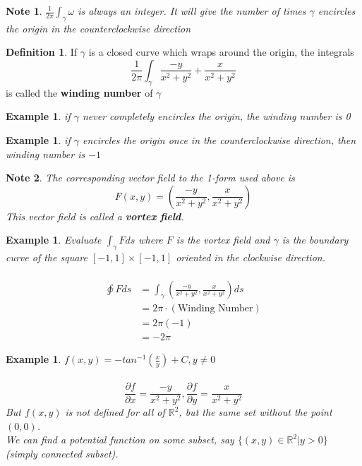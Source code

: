 \documentclass[12pt]{article}
\theoremstyle{plain}
\newtheorem*{note}{Note}
\newtheorem{example}[theorem]{Example}
\theoremstyle{definition}
\newtheorem{definition}[theorem]{Definition}
\begin{document}
	\begin{note}
		$\frac{1}{2\pi} \int_{\gamma} \omega$ is always an integer. It will give the number of times $\gamma$ encircles the origin in the counterclockwise direction
	\end{note}

	\begin{definition}
		If $\gamma$ is a closed curve which wraps around the origin, the integrals
		$$\frac{1}{2\pi} \int_{\gamma} \frac{-y}{x^2+y^2} + \frac{x}{x^2+y^2}$$
		is called the \textbf{winding number} of $\gamma$
	\end{definition}

	\begin{example}
		if $\gamma$ never completely encircles the origin, the winding number is 0
	\end{example}

	\begin{example}
		if $\gamma$ encircles the origin once in the counterclockwise direction, then winding number is $-1$
	\end{example}

	\begin{note}
		The corresponding vector field to the 1-form used above is
		$$F(x,y) = (\frac{-y}{x^2+y^2}, \frac{x}{x^2+y^2})$$
		This vector field is called a \textbf{vortex field}.
	\end{note}

	\begin{example}
		Evaluate $\int_\gamma F ds$ where $F$ is the vortex field and $\gamma$ is the boundary curve of the square $[-1,1] \times [-1,1]$ oriented in the clockwise direction.\\
		\\
		\begin{align*}
			\varointclockwise F ds &= \int_\gamma (\frac{-y}{x^2+y^2}, \frac{x}{x^2+y^2}) ds\\
			&= 2\pi \cdot (\text{Winding Number})\\
			&= 2\pi (-1)\\
			&= -2\pi
		\end{align*}
	\end{example}

	\begin{example}
		$f(x,y) = -tan^{-1} (\frac{x}{y}) + C, y\neq 0$\\
		\\
		$$\frac{\partial f}{\partial x} = \frac{-y}{x^2+y^2}, \frac{\partial f}{\partial y} = \frac{x}{x^2+y^2}$$
		But $f(x,y)$ is not defined for all of $\mathbb{R}^2$, but the same set without the point $(0,0)$.\\
		We can find a potential function on some subset, say $\{ (x,y)\in\mathbb{R}^2 | y>0 \}$ (simply connected subset).
	\end{example}
\end{document}
